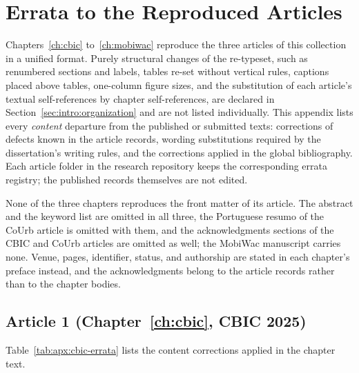 \chapter{Errata to the Reproduced Articles}
\label{apx:errata}

Chapters~\ref{ch:cbic} to~\ref{ch:mobiwac} reproduce the three articles of this
collection in a unified format. Purely structural changes of the re-typeset, such as
renumbered sections and labels, tables re-set without vertical rules, captions placed
above tables, one-column figure sizes, and the substitution of each article's textual
self-references by chapter self-references, are declared in
Section~\ref{sec:intro:organization} and are
not listed individually. This appendix lists every \emph{content} departure from the
published or submitted texts: corrections of defects known in the article records,
wording substitutions required by the dissertation's writing rules, and the
corrections applied in the global bibliography. Each article folder in the research
repository keeps the corresponding errata registry; the published records themselves
are not edited.

None of the three chapters reproduces the front matter of its article. The abstract and
the keyword list are omitted in all three, the Portuguese resumo of the CoUrb article is
omitted with them, and the acknowledgments sections of the CBIC and CoUrb articles are
omitted as well; the MobiWac manuscript carries none. Venue, pages, identifier, status,
and authorship are stated in each chapter's preface instead, and the acknowledgments
belong to the article records rather than to the chapter bodies.

\section{Article 1 (Chapter~\ref{ch:cbic}, CBIC 2025)}
\label{apx:errata:cbic}

Table~\ref{tab:apx:cbic-errata} lists the content corrections applied in the chapter
text.



